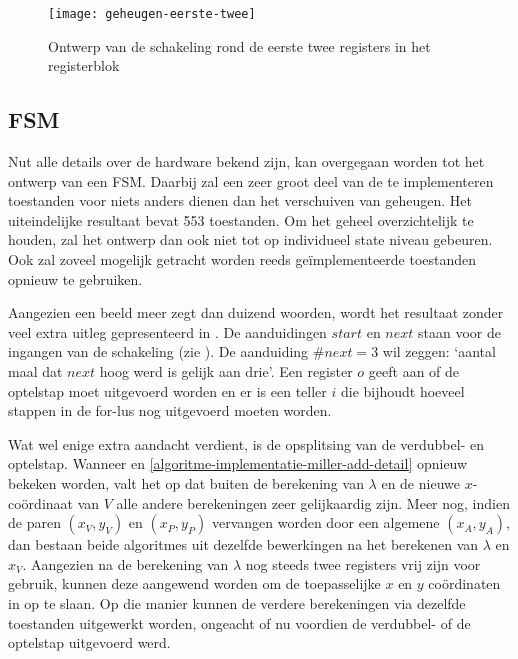 \begin{figure}[h]
	\centering
		\texttt{[image: geheugen-eerste-twee]}
		\caption{Ontwerp van de schakeling rond de eerste twee registers in het registerblok\label{figuur-implementatie-geheugen-eerste-twee}}
\end{figure}

\subsection{FSM}

Nut alle details over de hardware bekend zijn, kan overgegaan worden tot het ontwerp van een FSM. Daarbij zal een zeer groot deel van de te implementeren toestanden voor niets anders dienen dan het verschuiven van geheugen. Het uiteindelijke resultaat bevat 553 toestanden. Om het geheel overzichtelijk te houden, zal het ontwerp dan ook niet tot op individueel state niveau gebeuren. Ook zal zoveel mogelijk getracht worden reeds ge\"implementeerde toestanden opnieuw te gebruiken.

Aangezien een beeld meer zegt dan duizend woorden, wordt het resultaat zonder veel extra uitleg gepresenteerd in . De aanduidingen $start$ en $next$ staan voor de ingangen van de schakeling (zie ). De aanduiding $\#next = 3$ wil zeggen: `aantal maal dat $next$ hoog werd is gelijk aan drie'. Een register $o$ geeft aan of de optelstap moet uitgevoerd worden en er is een teller $i$ die bijhoudt hoeveel stappen in de for-lus nog uitgevoerd moeten worden.

Wat wel enige extra aandacht verdient, is de opsplitsing van de verdubbel- en optelstap. Wanneer  en \ref{algoritme-implementatie-miller-add-detail} opnieuw bekeken worden, valt het op dat buiten de berekening van $\lambda$ en de nieuwe $x$-co\"ordinaat van $V$ alle andere berekeningen zeer gelijkaardig zijn. Meer nog, indien de paren $(x_V, y_V)$ en $(x_P, y_P)$ vervangen worden door een algemene $(x_A, y_A)$, dan bestaan beide algoritmes uit dezelfde bewerkingen na het berekenen van $\lambda$ en $x_V$. Aangezien na de berekening van $\lambda$ nog steeds twee registers vrij zijn voor gebruik, kunnen deze aangewend worden om de toepasselijke $x$ en $y$ co\"ordinaten in op te slaan. Op die manier kunnen de verdere berekeningen via dezelfde toestanden uitgewerkt worden, ongeacht of nu voordien de verdubbel- of de optelstap uitgevoerd werd.

